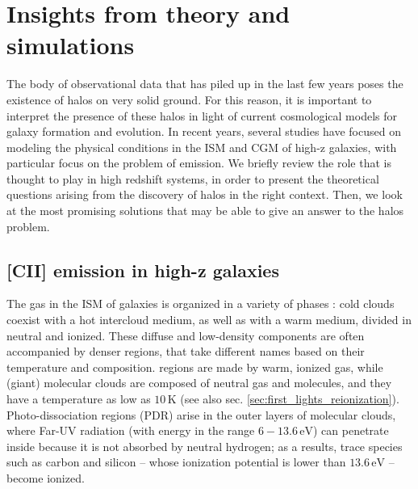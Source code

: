 \section{Insights from theory and simulations} \label{sec:theory_halos}


The body of observational data that has piled up in the last few years poses the existence of \CII halos on very solid ground. For this reason, it is important to interpret the presence of these halos in light of current cosmological models for galaxy formation and evolution. In recent years, several studies have focused on modeling the physical conditions in the ISM and CGM of high-z galaxies, with particular focus on the problem of \CII emission. We briefly review the role that \CII is thought to play in high redshift systems, in order to present the theoretical questions arising from the discovery of \CII halos in the right context. Then, we look at the most promising solutions that may be able to give an answer to the halos problem.

\subsection{[CII] emission in high-z galaxies} \label{sec:CII_models}




The gas in the ISM of galaxies is organized in a variety of phases \citep{tielens2005book}: cold clouds coexist with a hot intercloud medium, as well as with a warm medium, divided in neutral and ionized. These diffuse and low-density components are often accompanied by denser regions, that take different names based on their temperature and composition. \HII regions are made by warm, ionized gas, while (giant) molecular clouds are composed of neutral gas and molecules, and they have a temperature as low as $10\,\mathrm{K}$ (see also sec. \ref{sec:first_lights_reionization}). Photo-dissociation regions (PDR) arise in the outer layers of molecular clouds, where Far-UV radiation (with energy in the range $6-13.6\,\mathrm{eV}$) can penetrate inside because it is not absorbed by neutral hydrogen; as a results, trace species such as carbon and silicon -- whose ionization potential is lower than $13.6\,\mathrm{eV}$ -- become ionized.


